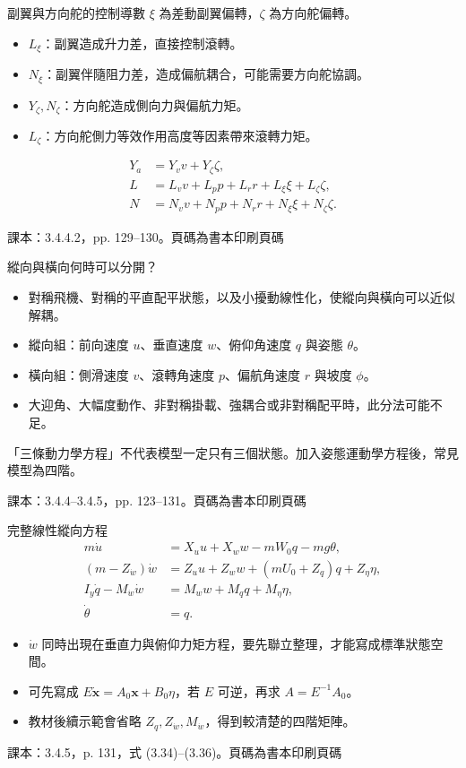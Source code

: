 \documentclass[aspectratio=169,11pt]{beamer}
\newcommand{\src}[1]{\par\vfill{\scriptsize\color{teal}#1}}
\newcommand{\slide}[3]{\begin{frame}[t]{#1}#3\src{#2}\end{frame}}
\newcommand{\bi}{\begin{itemize}\setlength{\itemsep}{5pt}}
\newcommand{\ei}{\end{itemize}}
\newcommand{\key}[1]{\par\medskip{\color{teal}\bfseries #1}\par\smallskip}
\newcommand{\bookslide}[3]{\slide{#1}{課本：#2。頁碼為書本印刷頁碼}{#3}}
\begin{document}
\bookslide{副翼與方向舵的控制導數}{3.4.4.2，pp. 129--130}{
\small
$\xi$ 為差動副翼偏轉，$\zeta$ 為方向舵偏轉。
\bi
\item $L_\xi$：副翼造成升力差，直接控制滾轉。
\item $N_\xi$：副翼伴隨阻力差，造成偏航耦合，可能需要方向舵協調。
\item $Y_\zeta,N_\zeta$：方向舵造成側向力與偏航力矩。
\item $L_\zeta$：方向舵側力等效作用高度等因素帶來滾轉力矩。
\ei
\[\begin{aligned}
Y_a&=Y_vv+Y_\zeta\zeta,\\
L&=L_vv+L_pp+L_rr+L_\xi\xi+L_\zeta\zeta,\\
N&=N_vv+N_pp+N_rr+N_\xi\xi+N_\zeta\zeta.
\end{aligned}\]
}
\bookslide{縱向與橫向何時可以分開？}{3.4.4--3.4.5，pp. 123--131}{
\bi
\item 對稱飛機、對稱的平直配平狀態，以及小擾動線性化，使縱向與橫向可以近似解耦。
\item 縱向組：前向速度 $u$、垂直速度 $w$、俯仰角速度 $q$ 與姿態 $\theta$。
\item 橫向組：側滑速度 $v$、滾轉角速度 $p$、偏航角速度 $r$ 與坡度 $\phi$。
\item 大迎角、大幅度動作、非對稱掛載、強耦合或非對稱配平時，此分法可能不足。
\ei
\key{階數提醒}「三條動力學方程」不代表模型一定只有三個狀態。加入姿態運動學方程後，常見模型為四階。
}
\bookslide{完整線性縱向方程}{3.4.5，p. 131，式 (3.34)--(3.36)}{
\small
\[\begin{aligned}
m\dot u&=X_u u+X_w w-mW_0q-mg\theta,\\
(m-Z_{\dot w})\dot w&=Z_u u+Z_w w+(mU_0+Z_q)q+Z_\eta\eta,\\
I_y\dot q-M_{\dot w}\dot w&=M_w w+M_q q+M_\eta\eta,\\
\dot\theta&=q.
\end{aligned}\]
\bi
\item $\dot w$ 同時出現在垂直力與俯仰力矩方程，要先聯立整理，才能寫成標準狀態空間。
\item 可先寫成 $E\dot{\mathbf x}=A_0\mathbf x+B_0\eta$，若 $E$ 可逆，再求 $A=E^{-1}A_0$。
\item 教材後續示範會省略 $Z_q,Z_{\dot w},M_{\dot w}$，得到較清楚的四階矩陣。
\ei
}
\end{document}
